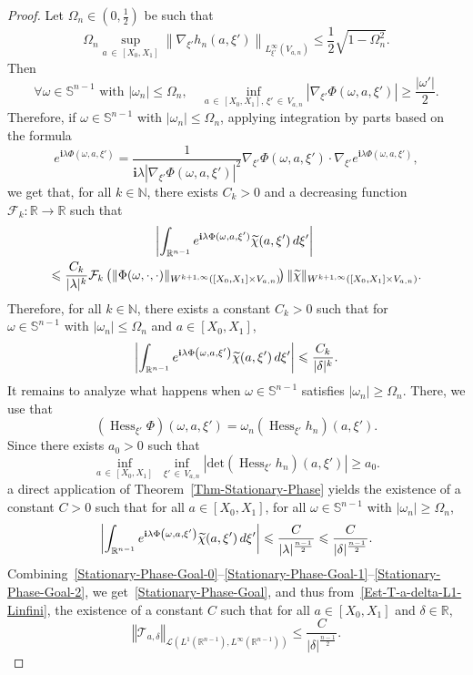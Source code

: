\documentclass[10pt]{amsart}
\theoremstyle{definition}\newtheorem{defi}[theo]{Definition}\newtheorem{rema}[theo]{Remark}\newtheorem{exam}[theo]{Example}\newtheorem{exem}[theo]{Example}\newtheorem{nota}[theo]{Notation}
\newcommand{\scL}{\mathscr{L}}
\newcommand{\scT}{\mathscr{T}}
\newcommand*\R{\mathbb{R}}
\newcommand*\N{\mathbb{N}}
\renewcommand*\S{\mathbb{S}}
\renewcommand{\i}{\mathbf{i}}
\newcommand{\clF}{\mathcal{F}}
\newcommand{\norm}[1]{\left\Vert#1\right\Vert}
\renewcommand{\leq}{\leqslant}
\renewcommand{\geq}{\geqslant}
\renewcommand{\tilde}{\widetilde}
\DeclareMathOperator{\Hess}{Hess}
\let\oldtilde\tilde
\renewcommand*{\tilde}[1]{\mathchoice{\widetilde{#1}}{\widetilde{#1}}{\oldtilde{#1}}{\oldtilde{#1}}}
\let\oldforall\forall
\renewcommand*{\forall}{\mathrel{\oldforall}}
\begin{document}
\begin{proof}
Let $\Omega_n \in (0,\frac{1}{2})$ be such that
\[
\Omega_n \sup_{a\, \in\,[X_0, X_1]}
\left\| \nabla_{\xi'} h_n(a,\xi')\right\|_{L^\infty_{\xi'}(V_{a,n})}
\leq
\frac{1}{2} \sqrt{1 - \Omega_n^2}.
\]
Then
\[
\forall \omega \in \S^{n-1} \text{ with } |\omega_n| \leq \Omega_n,
\quad
\inf_{a\, \in\,[X_0, X_1], \, \xi'\,\in \,V_{a,n}} \left|\nabla_{\xi'} \Phi(\omega,a,\xi')\right| \geq \frac{|\omega'|}{2}.
\]
Therefore, if $\omega \in \S^{n-1}$ with $|\omega_n| \leq \Omega_n$, applying integration by parts based on the formula
\[
e^{\i \lambda \Phi(\omega, a, \xi')} =
\frac{1}{\i \lambda |\nabla_{\xi'} \Phi(\omega,a,\xi')|^2} \nabla_{\xi'} \Phi\left(\omega,a,\xi'\right) \cdot \nabla_{\xi'} e^{\i \lambda \Phi(\omega, a, \xi')},
\]
we get that, for all $k \in \N$, there exists $C_k>0$ and a decreasing function $\clF_k: \R \to \R$ such that
\begin{multline*}
\!\!\left|
\int_{\R^{n-1}} e^{\i \lambda \Phi(\omega, a, \xi')} \tilde \chi(a,\xi') \, d \xi'
\right|
\\
\leq 
\frac{C_k}{|\lambda|^k } \clF_k\left(\| \Phi (\omega, \cdot, \cdot) \|_{W^{k+1,\infty}\left([X_0,X_1] \times V_{a,n}\right)}\!\right) \|\tilde \chi \|_{W^{k+1,\infty}\left([X_0,X_1] \times V_{a,n}\right)}.
\end{multline*}
Therefore, for all $k \in \N$, there exists a constant $C_k>0$ such that for $\omega \in \S^{n-1} \text{ with } |\omega_n| \leq \Omega_n$ and $a \in [X_0, X_1]$,
\begin{equation}\label{Stationary-Phase-Goal-1}
\left|
\int_{\R^{n-1}} e^{\i \lambda \Phi\left(\omega, a, \xi'\right)} \tilde \chi(a,\xi') \, d \xi'
\right|
\leq
\frac{C_k}{|\delta|^k}.
\end{equation}
It remains to analyze what happens when $\omega \in \S^{n-1}$ satisfies $|\omega_n| \geq \Omega_n$. There, we use that
\[
\left(\Hess_{\xi'} \Phi\right)(\omega, a, \xi') = \omega_n \left(\Hess_{\xi'} h_n\right)(a,\xi').
\]
Since there exists $a_0 >0$ such that
\[
\inf_{a\, \in\,[X_0,X_1]}\; \inf_{\xi'\,\in\,V_{a,n}} \left|\text{det} \left(\Hess_{\xi'} h_n\right)(a, \xi') \right| \geq a_0.
\]
a direct application of Theorem~\ref{Thm-Stationary-Phase} yields the existence of a constant $C>0$ such that for all $a \in [X_0, X_1]$, for all $\omega \in \S^{n-1}$ with $|\omega_n | \geq \Omega_n$,
\begin{equation}\label{Stationary-Phase-Goal-2}
\left|
\int_{\R^{n-1}} e^{\i \lambda \Phi\left(\omega, a, \xi'\right)} \tilde \chi(a,\xi') \, d \xi'
\right|
\leq
\frac{C}{|\lambda|^{\frac{n-1}{2}}}
\leq
\frac{C}{|\delta|^{\frac{n-1}{2}}}.
\end{equation}
Combining~\eqref{Stationary-Phase-Goal-0}--\eqref{Stationary-Phase-Goal-1}--\eqref{Stationary-Phase-Goal-2}, we get~\eqref{Stationary-Phase-Goal}, and thus from~\eqref{Est-T-a-delta-L1-Linfini}, the existence of a constant $C$ such that for all $a \in [X_0, X_1]$ and $\delta \in \R$,
\begin{equation}\label{Est-T-a-delta-L1-Linfini-Final}
\norm{
\scT_{a,\delta} }_{\scL\left(L^{1}\left(\R^{n-1}\right), L^\infty\left(\R^{n-1}\right)\right)}
\leq
\frac{C}{|\delta|^{\frac{n-1}{2}}}.
\end{equation}


\end{proof}
\end{document}
